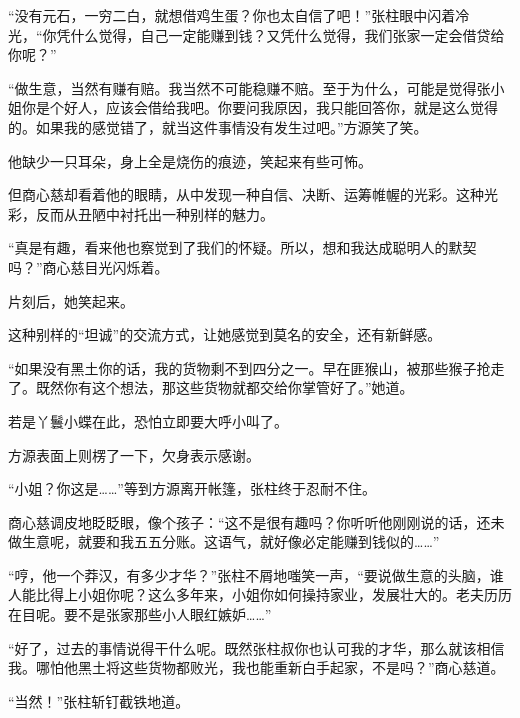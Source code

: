 \begin{this_body}
“没有元石，一穷二白，就想借鸡生蛋？你也太自信了吧！”张柱眼中闪着冷光，“你凭什么觉得，自己一定能赚到钱？又凭什么觉得，我们张家一定会借贷给你呢？”

“做生意，当然有赚有赔。我当然不可能稳赚不赔。至于为什么，可能是觉得张小姐你是个好人，应该会借给我吧。你要问我原因，我只能回答你，就是这么觉得的。如果我的感觉错了，就当这件事情没有发生过吧。”方源笑了笑。

他缺少一只耳朵，身上全是烧伤的痕迹，笑起来有些可怖。

但商心慈却看着他的眼睛，从中发现一种自信、决断、运筹帷幄的光彩。这种光彩，反而从丑陋中衬托出一种别样的魅力。

“真是有趣，看来他也察觉到了我们的怀疑。所以，想和我达成聪明人的默契吗？”商心慈目光闪烁着。

片刻后，她笑起来。

这种别样的“坦诚”的交流方式，让她感觉到莫名的安全，还有新鲜感。

“如果没有黑土你的话，我的货物剩不到四分之一。早在匪猴山，被那些猴子抢走了。既然你有这个想法，那这些货物就都交给你掌管好了。”她道。

若是丫鬟小蝶在此，恐怕立即要大呼小叫了。

方源表面上则楞了一下，欠身表示感谢。

“小姐？你这是……”等到方源离开帐篷，张柱终于忍耐不住。

商心慈调皮地眨眨眼，像个孩子：“这不是很有趣吗？你听听他刚刚说的话，还未做生意呢，就要和我五五分账。这语气，就好像必定能赚到钱似的……”

“哼，他一个莽汉，有多少才华？”张柱不屑地嗤笑一声，“要说做生意的头脑，谁人能比得上小姐你呢？这么多年来，小姐你如何操持家业，发展壮大的。老夫历历在目呢。要不是张家那些小人眼红嫉妒……”

“好了，过去的事情说得干什么呢。既然张柱叔你也认可我的才华，那么就该相信我。哪怕他黑土将这些货物都败光，我也能重新白手起家，不是吗？”商心慈道。

“当然！”张柱斩钉截铁地道。

\end{this_body}

